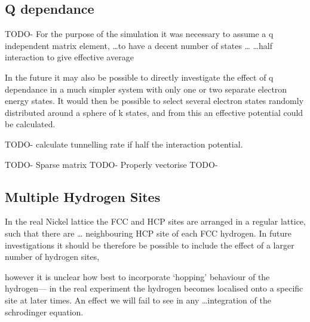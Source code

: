 \subsection{Q dependance}
TODO-
For the purpose of the simulation
it was necessary to assume a q independent
matrix element, \ldots to have a decent number of states \ldots
\ldots half interaction to give effective average

In the future it may also be possible to
directly investigate the effect
of q dependance in a much simpler system
with only one or two separate electron
energy states.
It would then be possible to select
several electron states randomly distributed
around a sphere of k states, and from
this an effective potential could be calculated.

TODO- calculate tunnelling rate if half the
interaction potential.

TODO- Sparse matrix
TODO- Properly vectorise
TODO-

\subsection{Multiple Hydrogen Sites}
In the real Nickel lattice the FCC and
HCP sites are arranged in a regular
lattice, such that there are \ldots
neighbouring HCP site of each FCC
hydrogen. In future investigations
it should be therefore be
possible to include the
effect of a larger number of
hydrogen sites,

however
it is unclear how best to
incorporate `hopping' behaviour
of the hydrogen--- in the real
experiment the hydrogen becomes
localised onto a specific site
at later times. An effect we will
fail to see in any \ldots integration of
the schrodinger equation.